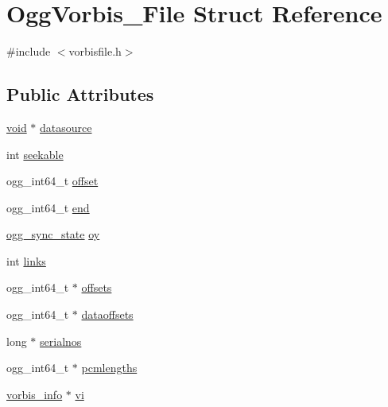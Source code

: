 \hypertarget{struct_ogg_vorbis___file}{}\section{Ogg\+Vorbis\+\_\+\+File Struct Reference}
\label{struct_ogg_vorbis___file}


{\ttfamily \#include $<$vorbisfile.\+h$>$}

\subsection*{Public Attributes}
\begin{DoxyCompactItemize}
\item 
\mbox{\hyperlink{_s_d_l__opengles2__gl2ext_8h_ae5d8fa23ad07c48bb609509eae494c95}{void}} $\ast$ \mbox{\hyperlink{struct_ogg_vorbis___file_a46afb3dcc7aac5917573e41d7504c0d6}{datasource}}
\item 
int \mbox{\hyperlink{struct_ogg_vorbis___file_a2a390c4f15c0d1fe0cf9c90fd0bae087}{seekable}}
\item 
ogg\+\_\+int64\+\_\+t \mbox{\hyperlink{struct_ogg_vorbis___file_a36f8f9f012cd2e7ab8cb395b787376cb}{offset}}
\item 
ogg\+\_\+int64\+\_\+t \mbox{\hyperlink{struct_ogg_vorbis___file_ae56eb8bc78d2fc27c79d145a7c80a681}{end}}
\item 
\mbox{\hyperlink{structogg__sync__state}{ogg\+\_\+sync\+\_\+state}} \mbox{\hyperlink{struct_ogg_vorbis___file_ae35fa1e6f99edcb104566301324ecf94}{oy}}
\item 
int \mbox{\hyperlink{struct_ogg_vorbis___file_ad41f80ffaa6b48a14addef0a02639a87}{links}}
\item 
ogg\+\_\+int64\+\_\+t $\ast$ \mbox{\hyperlink{struct_ogg_vorbis___file_af9fe0ece4ff98e207682731b36951920}{offsets}}
\item 
ogg\+\_\+int64\+\_\+t $\ast$ \mbox{\hyperlink{struct_ogg_vorbis___file_af797824fb6e98c0248c19e6909dd680e}{dataoffsets}}
\item 
long $\ast$ \mbox{\hyperlink{struct_ogg_vorbis___file_abd5a9adc78abd620ce2c63bd153df150}{serialnos}}
\item 
ogg\+\_\+int64\+\_\+t $\ast$ \mbox{\hyperlink{struct_ogg_vorbis___file_a88a4e6a4ec6c9837d44e6cc0c864679e}{pcmlengths}}
\item 
\mbox{\hyperlink{structvorbis__info}{vorbis\+\_\+info}} $\ast$ \mbox{\hyperlink{struct_ogg_vorbis___file_aa5586b939d7c31c8eec83cf1380b45a6}{vi}}
\item 

\end{DoxyCompactItemize}

